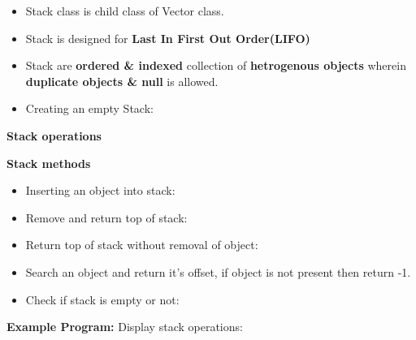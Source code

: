 \setlength{\columnsep}{3pt}
\begin{flushleft}
	
	\begin{itemize}
		\item Stack class is child class of Vector class.
	
		\item Stack is designed for \textbf{Last In First Out Order(LIFO)}

		\item Stack are \textbf{ordered \& indexed} collection of \textbf{hetrogenous objects} wherein \textbf{duplicate objects \& null} is allowed. 

		
		\item Creating an empty Stack:
		
	\end{itemize}

	
	\textbf{Stack operations}

	
	\newpage
	\textbf{Stack methods}
	\begin{itemize}
		\item Inserting an object into stack:
		\bigskip
		\item Remove and return top of stack:
		\bigskip
		\item Return top of stack without removal of object:

		\item Search an object and return it's offset, if  object is not present then return -1.
		\bigskip
		\item Check if stack is empty or not:
		
	\end{itemize}
	\newpage
	\textbf{Example Program:}
	\newline
	Display stack operations:
	
\end{flushleft}

\newpage

 